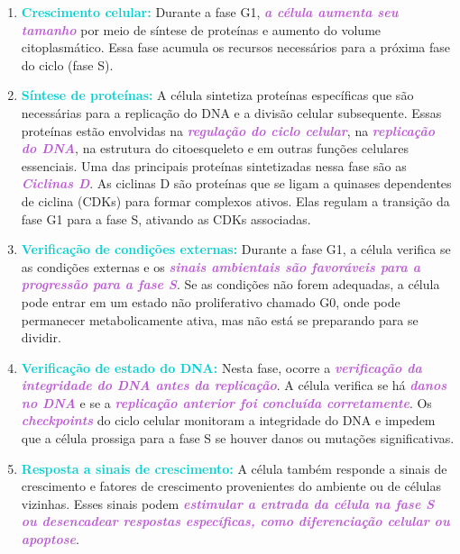 \documentclass[11pt,a4paper]{article}
\begin{document}
	\begin{enumerate}
		\item \textcolor{DarkTurquoise}{\textbf{Crescimento celular:}} Durante a fase G1, \textcolor{MediumOrchid}{\textbf{\textit{a célula aumenta seu tamanho}}} por meio de síntese de proteínas e aumento do volume citoplasmático. Essa fase acumula os recursos necessários para a próxima fase do ciclo (fase S).
		\item \textcolor{DarkTurquoise}{\textbf{Síntese de proteínas:}} A célula sintetiza proteínas específicas que são necessárias para a replicação do DNA e a divisão celular subsequente. Essas proteínas estão envolvidas na \textcolor{MediumOrchid}{\textbf{\textit{regulação do ciclo celular}}}, na \textcolor{MediumOrchid}{\textbf{\textit{replicação do DNA}}}, na estrutura do citoesqueleto e em outras funções celulares essenciais. Uma das principais proteínas sintetizadas nessa fase são as \textcolor{MediumOrchid}{\textbf{\textit{Ciclinas D}}}. As ciclinas D são proteínas que se ligam a quinases dependentes de ciclina (CDKs) para formar complexos ativos. Elas regulam a transição da fase G1 para a fase S, ativando as CDKs associadas.
		\item \textcolor{DarkTurquoise}{\textbf{Verificação de condições externas:}} Durante a fase G1, a célula verifica se as condições externas e os \textcolor{MediumOrchid}{\textbf{\textit{sinais ambientais são favoráveis para a progressão para a fase S}}}. Se as condições não forem adequadas, a célula pode entrar em um estado não proliferativo chamado G0, onde pode permanecer metabolicamente ativa, mas não está se preparando para se dividir.
		\item \textcolor{DarkTurquoise}{\textbf{Verificação de estado do DNA:}}  Nesta fase, ocorre a \textcolor{MediumOrchid}{\textbf{\textit{verificação da integridade do DNA antes da replicação}}}. A célula verifica se há\textcolor{MediumOrchid}{\textbf{\textit{ danos no DNA}}} e se a \textcolor{MediumOrchid}{\textbf{\textit{replicação anterior foi concluída corretamente}}}. Os \textcolor{MediumOrchid}{\textbf{\textit{checkpoints}}} do ciclo celular monitoram a integridade do DNA e impedem que a célula prossiga para a fase S se houver danos ou mutações significativas.
		\item \textcolor{DarkTurquoise}{\textbf{Resposta a sinais de crescimento:}} A célula também responde a sinais de crescimento e fatores de crescimento provenientes do ambiente ou de células vizinhas. Esses sinais podem\textcolor{MediumOrchid}{\textbf{\textit{ estimular a entrada da célula na fase S ou desencadear respostas específicas, como diferenciação celular ou apoptose}}}.
	\end{enumerate}
\end{document}
